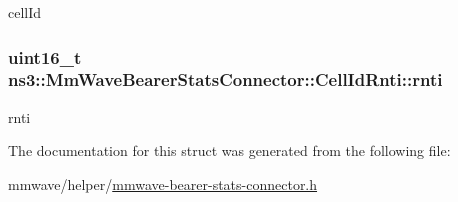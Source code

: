 cell\+Id 

\subsubsection[{\texorpdfstring{rnti}{rnti}}]{\setlength{\rightskip}{0pt plus 5cm}uint16\+\_\+t ns3\+::\+Mm\+Wave\+Bearer\+Stats\+Connector\+::\+Cell\+Id\+Rnti\+::rnti}\hypertarget{structns3_1_1MmWaveBearerStatsConnector_1_1CellIdRnti_af9e747eb73bc472faad6e24374a3645c}{}\label{structns3_1_1MmWaveBearerStatsConnector_1_1CellIdRnti_af9e747eb73bc472faad6e24374a3645c}


rnti 



The documentation for this struct was generated from the following file\+:\begin{DoxyCompactItemize}
\item 
mmwave/helper/\hyperlink{mmwave-bearer-stats-connector_8h}{mmwave-\/bearer-\/stats-\/connector.\+h}\end{DoxyCompactItemize}
